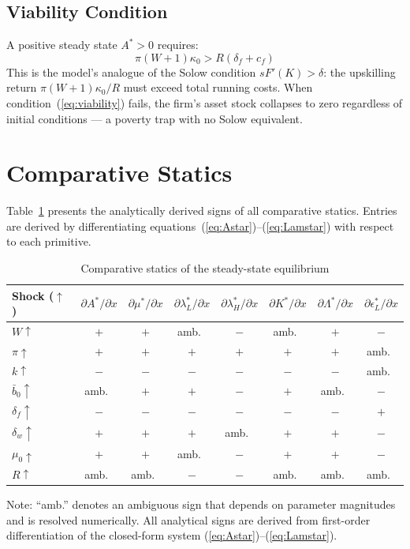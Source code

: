 \documentclass[12pt,a4paper]{article}
\begin{document}
\subsection{Viability Condition}

A positive steady state $A^* > 0$ requires:
\begin{equation}
  \pi(W+1)\kappa_0 > R(\delta_f + c_f)
  \label{eq:viability}
\end{equation}
This is the model's analogue of the Solow condition $sF'(K) > \delta$:
the upskilling return $\pi(W+1)\kappa_0/R$ must exceed total running costs.
When condition~(\ref{eq:viability}) fails, the firm's asset stock collapses
to zero regardless of initial conditions — a poverty trap with no Solow equivalent.

\section{Comparative Statics}

Table~\ref{tab:cs} presents the analytically derived signs of all
comparative statics. Entries are derived by differentiating
equations~(\ref{eq:Astar})--(\ref{eq:Lamstar}) with respect to each primitive.

\begin{table}[h!]
\centering
\caption{Comparative statics of the steady-state equilibrium}
\label{tab:cs}
\begin{tabular}{lccccccc}
\toprule
Shock ($\uparrow$)
  & $\partial A^*/\partial x$
  & $\partial \mu^*/\partial x$
  & $\partial \lambda_L^*/\partial x$
  & $\partial \lambda_H^*/\partial x$
  & $\partial K^*/\partial x$
  & $\partial \Lambda^*/\partial x$
  & $\partial \epsilon_L^*/\partial x$ \\
\midrule
$W\uparrow$     & $+$ & $+$ & amb.\ & $-$ & amb.\ & $+$ & $-$ \\
$\pi\uparrow$   & $+$ & $+$ & $+$   & $+$ & $+$   & $+$ & amb.\ \\
$k\uparrow$     & $-$ & $-$ & $-$   & $-$ & $-$   & $-$ & amb.\ \\
$\bar{b}_0\uparrow$ & amb.\ & $+$ & $+$ & $-$ & $+$ & amb.\ & $-$ \\
$\delta_f\uparrow$ & $-$ & $-$ & $-$ & $-$ & $-$  & $-$ & $+$ \\
$\delta_w\uparrow$ & $+$ & $+$ & $+$ & amb.\ & $+$ & $+$ & $-$ \\
$\mu_0\uparrow$ & $+$ & $+$ & amb.\ & $-$ & $+$   & $+$ & $-$ \\
$R\uparrow$     & amb.\ & amb.\ & $-$ & $-$ & amb.\ & amb.\ & amb.\ \\
\bottomrule
\end{tabular}
\medskip

\small Note: ``amb.'' denotes an ambiguous sign that depends on parameter
magnitudes and is resolved numerically. All analytical signs are
derived from first-order differentiation of the closed-form system
(\ref{eq:Astar})--(\ref{eq:Lamstar}).
\end{table}
\end{document}
